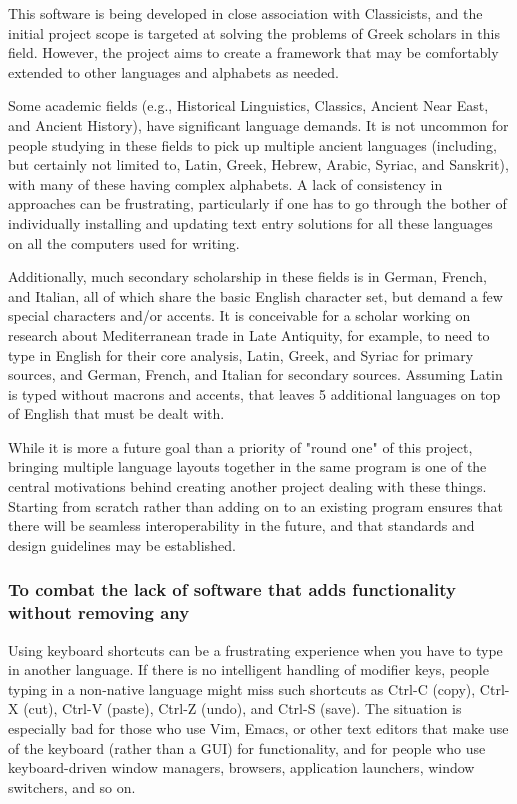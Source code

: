 \documentclass[11pt]{article}
\begin{document}
This software is being developed in close association with Classicists, and the initial project scope is targeted at solving the problems of Greek scholars in this field. However, the project aims to create a framework that may be comfortably extended to other languages and alphabets as needed.

Some academic fields (e.g., Historical Linguistics, Classics, Ancient Near East, and Ancient History), have significant language demands. It is not uncommon for people studying in these fields to pick up multiple ancient languages (including, but certainly not limited to, Latin, Greek, Hebrew, Arabic, Syriac, and Sanskrit), with many of these having complex alphabets. A lack of consistency in approaches can be frustrating, particularly if one has to go through the bother of individually installing and updating text entry solutions for all these languages on all the computers used for writing.

Additionally, much secondary scholarship in these fields is in German, French, and Italian, all of which share the basic English character set, but demand a few special characters and/or accents. It is conceivable for a scholar working on research about Mediterranean trade in Late Antiquity, for example, to need to type in English for their core analysis, Latin, Greek, and Syriac for primary sources, and German, French, and Italian for secondary sources. Assuming Latin is typed without macrons and accents, that leaves 5 additional languages on top of English that must be dealt with.

While it is more a future goal than a priority of "round one" of this project, bringing multiple language layouts together in the same program is one of the central motivations behind creating another project dealing with these things. Starting from scratch rather than adding on to an existing program ensures that there will be seamless interoperability in the future, and that standards and design guidelines may be established.

\subsubsection{To combat the lack of software that adds functionality without removing any}
\label{sec:orgb4181c2}

Using keyboard shortcuts can be a frustrating experience when you have to type in another language. If there is no intelligent handling of modifier keys, people typing in a non-native language might miss such shortcuts as Ctrl-C (copy), Ctrl-X (cut), Ctrl-V (paste), Ctrl-Z (undo), and Ctrl-S (save). The situation is especially bad for those who use Vim, Emacs, or other text editors that make use of the keyboard (rather than a GUI) for functionality, and for people who use keyboard-driven window managers, browsers, application launchers, window switchers, and so on.
\end{document}

